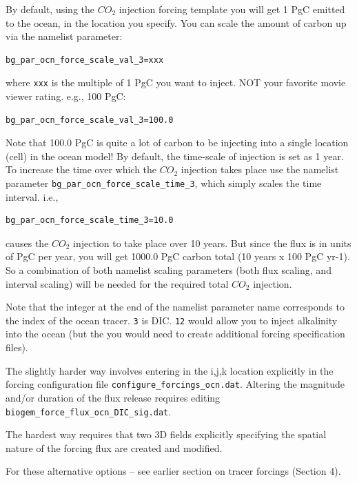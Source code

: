 \documentclass[11pt,fleqn]{book} %
\begin{document}
By default, using the \(CO_{2}\) injection forcing template you will get 1 PgC emitted to the 
ocean, in the location you specify. You can scale the amount of carbon up via the namelist parameter:
\vspace{-2pt}\begin{verbatim}
bg_par_ocn_force_scale_val_3=xxx
\end{verbatim}\vspace{-2pt}
where \texttt{xxx} is the multiple of 1 PgC you want to inject. NOT your favorite movie viewer rating. e.g., 100 PgC:
\vspace{-2pt}\begin{verbatim}
bg_par_ocn_force_scale_val_3=100.0
\end{verbatim}\vspace{-2pt}
Note that 100.0 PgC is quite a lot of carbon to be injecting into a single location (cell) in the ocean model! By default, the time-scale of injection is set as 1 year. To increase the time over which the \(CO_{2}\) injection takes place use the namelist parameter \texttt{bg\_par\_ocn\_force\_scale\_time\_3}, which simply scales the time interval. i.e.,
\vspace{-2pt}\begin{verbatim}
bg_par_ocn_force_scale_time_3=10.0
\end{verbatim}\vspace{-2pt}
causes the \(CO_{2}\) injection to take place over 10 years. But since the flux is in units of PgC per year, you will get 1000.0 PgC carbon total (10 years x 100 PgC yr-1). So a combination of both namelist scaling parameters (both flux scaling, and interval scaling) will be needed for the required total \(CO_{2}\) injection.

Note that the integer at the end of the namelist parameter name corresponds to the index of the ocean tracer. \texttt{3} is DIC. \texttt{12} would allow you to inject alkalinity into the ocean (but the you would need to create additional forcing specification files).

The slightly harder way involves entering in the i,j,k location explicitly in the forcing configuration file \texttt{configure\_forcings\_ocn.dat}. Altering the magnitude and/or duration of the flux release requires editing \texttt{biogem\_force\_flux\_ocn\_DIC\_sig.dat}.

The hardest way requires that two 3D fields explicitly specifying the spatial nature of the forcing flux are created and modified.

For these alternative options -- see earlier section on tracer forcings (Section 4).
\end{document}
